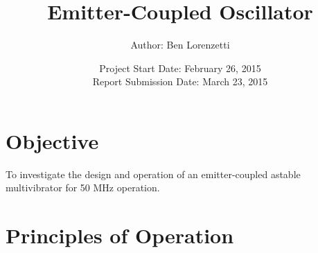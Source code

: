 \documentclass[titlepage, letterpaper, 10.5pt]{article}
\begin{document}
\title{Emitter-Coupled Oscillator}
\author{Author: Ben Lorenzetti}
\date{Project Start Date: February 26, 2015\\
Report Submission Date: March 23, 2015}
\maketitle

\clearpage
\mbox{}
\thispagestyle{empty}
\clearpage
\setcounter{page}{1}

\tableofcontents

\section{Objective}

To investigate the design and operation of an emitter-coupled astable multivibrator for 50
MHz operation.

\clearpage
\section{Principles of Operation}
\end{document}
